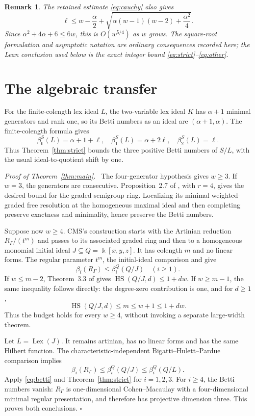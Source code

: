\documentclass[11pt,a4paper]{article}
\newtheorem{remark}[theorem]{Remark}
\newenvironment{proof}[1][Proof]{\par\noindent\textit{#1.}\ \ignorespaces}{\unskip\nobreak\hfill\ensuremath{\square}\par}
\newcommand{\kk}{\Bbbk}
\newcommand{\HS}{\operatorname{HS}}
\newcommand{\Lex}{\operatorname{Lex}}
\begin{document}
\begin{remark}
The retained estimate \eqref{eq:cauchy} also gives
\[
 \ell\le w-\frac\alpha2+
   \sqrt{\alpha(w-1)(w-2)+\frac{\alpha^2}{4}}.
\]
Since $\alpha^2+4\alpha+6\le6w$, this is $O(w^{5/4})$ as $w$ grows. The square-root formulation and asymptotic notation are ordinary consequences recorded here; the Lean conclusion used below is the exact integer bound \eqref{eq:strict}--\eqref{eq:other}.
\end{remark}

\section{The algebraic transfer}
For the finite-colength lex ideal $L$, the two-variable lex ideal $K$ has $\alpha+1$ minimal generators and rank one, so its Betti numbers as an ideal are $(\alpha+1,\alpha)$. The finite-colength formula \cite[equation~(7)]{CMS} gives
\begin{equation}\label{eq:betti}
 \beta_0^S(L)=\alpha+1+\ell,\quad
 \beta_1^S(L)=\alpha+2\ell,\quad
 \beta_2^S(L)=\ell.
\end{equation}
Thus Theorem~\ref{thm:strict} bounds the three positive Betti numbers of $S/L$, with the usual ideal-to-quotient shift by one.

\begin{proof}[Proof of Theorem~\ref{thm:main}]
The four-generator hypothesis gives $w\ge3$. If $w=3$, the generators are consecutive. Proposition~2.7 of \cite{HS}, with $r=4$, gives the desired bound for the graded semigroup ring. Localizing its minimal weighted-graded free resolution at the homogeneous maximal ideal and then completing preserve exactness and minimality, hence preserve the Betti numbers.

Suppose now $w\ge4$. CMS's construction starts with the Artinian reduction $R_\Gamma/(t^m)$ and passes to its associated graded ring and then to a homogeneous monomial initial ideal $J\subseteq Q=\kk[x,y,z]$. It has colength $m$ and no linear forms. The regular parameter $t^m$, the initial-ideal comparison and \cite[equation~(1)]{CMS} give
\[
 \beta_i(R_\Gamma)\le\beta_i^Q(Q/J)\quad(i\ge1).
\]
If $w\le m-2$, Theorem~3.3 of \cite{CMS} gives $\HS(Q/J,d)\le1+dw$. If $w\ge m-1$, the same inequality follows directly: the degree-zero contribution is one, and for $d\ge1$,
\[
 \HS(Q/J,d)\le m\le w+1\le1+dw.
\]
Thus the budget holds for every $w\ge4$, without invoking a separate large-width theorem.

Let $L=\Lex(J)$. It remains artinian, has no linear forms and has the same Hilbert function. The characteristic-independent Bigatti--Hulett--Pardue comparison \cite[Theorem~2.1]{CMS} implies
\[
 \beta_i(R_\Gamma)\le\beta_i^Q(Q/J)\le\beta_i^Q(Q/L).
\]
Apply \eqref{eq:betti} and Theorem~\ref{thm:strict} for $i=1,2,3$. For $i\ge4$, the Betti numbers vanish: $R_\Gamma$ is one-dimensional Cohen--Macaulay with a four-dimensional minimal regular presentation, and therefore has projective dimension three. This proves both conclusions.
\end{proof}
\end{document}
